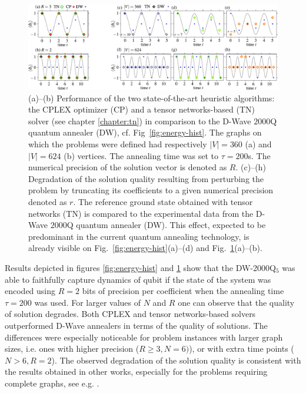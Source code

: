 \begin{figure}
  \centering
  \includegraphics[width=\textwidth]{figures/fig34_merge.pdf}
  \caption{ (a)--(b) Performance of the two state-of-the-art heuristic
    algorithms: the CPLEX optimizer (CP) and a tensor networks-based (TN) solver
	(see chapter \ref{chapter:tn}) in comparison to the D-Wave $2000$Q quantum annealer (DW),
    cf. Fig~\ref{fig:energy-hist}. The graphs on which the problems were defined
	had respectively $|V|=360$ (a) and $|V|=624$ (b) vertices. The annealing time was set
    to $\tau=200$\textmu{}s. The numerical precision of the solution vector is
    denoted as $R$. %
    (c)--(h) Degradation of the solution quality resulting from perturbing the
    problem by truncating its coefficients to a given
    numerical precision denoted as $r$. The reference ground state obtained
    with tensor networks (TN) is compared to the  experimental data from the
	D-Wave $2000$Q quantum annealer (DW). This effect, expected to be predominant
	in the current quantum annealing technology, is already visible on
    Fig.~\ref{fig:energy-hist}(a)--(d) and Fig.~\ref{fig:cplex_tn_dwave}(a)--(b).
    }
  \label{fig:cplex_tn_dwave}
\end{figure}

Results depicted in figures \ref{fig:energy-hist} and \ref{fig:cplex_tn_dwave}
show that the DW-2000Q$_{5}$ was able to faithfully capture dynamics of qubit
if the state of the system was encoded using $R=2$ bits of precision per
coefficient when the annealing time $\tau=200$ was used. For larger values of
$N$ and $R$ one can observe that the quality of solution degrades.
Both CPLEX and tensor networks-based solvers outperformed D-Wave
annealers in terms of the quality of solutions. The differences were especially
noticeable for problem instances with larger graph sizes, i.e. ones with higher
precision ($R \ge 3, N=6)$), or with extra time points ($N > 6, R = 2$). The
observed degradation of the solution quality is consistent with the results
obtained in other works, especially for the problems requiring complete graphs,
see e.g. \cite{Hamerly2019}.

